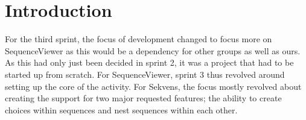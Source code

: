 \section{Introduction}
For the third sprint, the focus of development changed to focus more on SequenceViewer as this would be a dependency for other groups as well as ours. As this had only just been decided in sprint 2, it was a project that had to be started up from scratch. For SequenceViewer, sprint 3 thus revolved around setting up the core of the activity. For Sekvens, the focus mostly revolved about creating the support for two major requested features; the ability to create choices within sequences and nest sequences within each other.